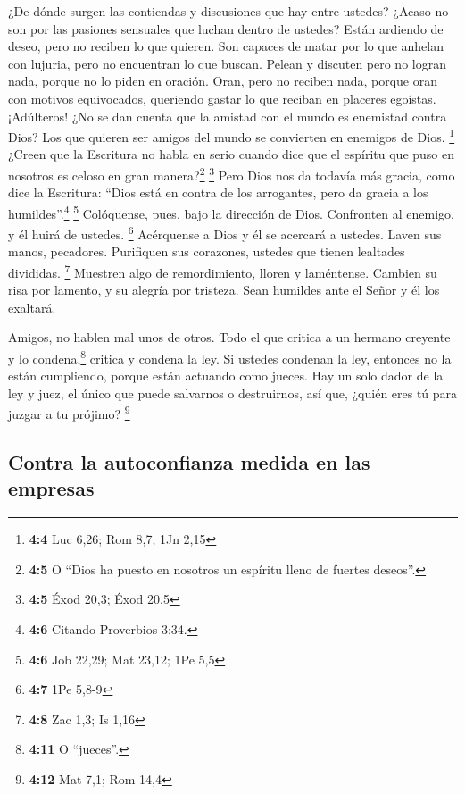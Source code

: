  ¿De dónde surgen las contiendas y discusiones que hay
entre ustedes? ¿Acaso no son por las pasiones sensuales que luchan
dentro de ustedes?  Están ardiendo de deseo, pero no
reciben lo que quieren. Son capaces de matar por lo que anhelan con
lujuria, pero no encuentran lo que buscan. Pelean y discuten pero no
logran nada, porque no lo piden en oración.  Oran, pero no
reciben nada, porque oran con motivos equivocados, queriendo gastar lo
que reciban en placeres egoístas.  ¡Adúlteros! ¿No se dan
cuenta que la amistad con el mundo es enemistad contra Dios? Los que
quieren ser amigos del mundo se convierten en enemigos de Dios.
\footnote{\textbf{4:4} Luc 6,26; Rom 8,7; 1Jn 2,15} 
¿Creen que la Escritura no habla en serio cuando dice que el espíritu
que puso en nosotros es celoso en gran manera?\footnote{\textbf{4:5} O
  ``Dios ha puesto en nosotros un espíritu lleno de fuertes deseos''.}
\footnote{\textbf{4:5} Éxod 20,3; Éxod 20,5}  Pero Dios
nos da todavía más gracia, como dice la Escritura: ``Dios está en contra
de los arrogantes, pero da gracia a los humildes''.\footnote{\textbf{4:6}
  Citando Proverbios 3:34.} \footnote{\textbf{4:6} Job 22,29; Mat 23,12;
  1Pe 5,5}  Colóquense, pues, bajo la dirección de Dios.
Confronten al enemigo, y él huirá de ustedes. \footnote{\textbf{4:7} 1Pe
  5,8-9}  Acérquense a Dios y él se acercará a ustedes.
Laven sus manos, pecadores. Purifiquen sus corazones, ustedes que tienen
lealtades divididas. \footnote{\textbf{4:8} Zac 1,3; Is 1,16}
 Muestren algo de remordimiento, lloren y laméntense.
Cambien su risa por lamento, y su alegría por tristeza. 
Sean humildes ante el Señor y él los exaltará.

 Amigos, no hablen mal unos de otros. Todo el que critica
a un hermano creyente y lo condena,\footnote{\textbf{4:11} O ``jueces''.}
critica y condena la ley. Si ustedes condenan la ley, entonces no la
están cumpliendo, porque están actuando como jueces.  Hay
un solo dador de la ley y juez, el único que puede salvarnos o
destruirnos, así que, ¿quién eres tú para juzgar a tu prójimo?
\footnote{\textbf{4:12} Mat 7,1; Rom 14,4}

\hypertarget{contra-la-autoconfianza-medida-en-las-empresas}{%
\subsection{Contra la autoconfianza medida en las
empresas}\label{contra-la-autoconfianza-medida-en-las-empresas}}

